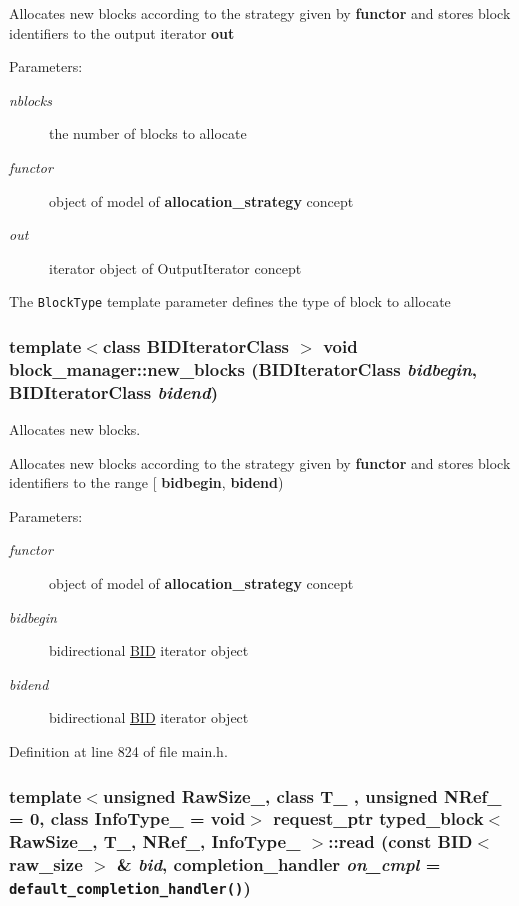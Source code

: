 Allocates new blocks according to the strategy given by {\bf functor} and stores block identifiers to the output iterator {\bf out} \begin{Desc}
\item[Parameters:]
\begin{description}
\item[{\em nblocks}]the number of blocks to allocate \item[{\em functor}]object of model of {\bf allocation\_\-strategy} concept \item[{\em out}]iterator object of OutputIterator concept\end{description}
\end{Desc}
The {\tt BlockType} template parameter defines the type of block to allocate \hypertarget{group__mnglayer_gb012fd7abe2b4b529b9f6b339aff4232}{
\subsubsection[{new\_\-blocks}]{\setlength{\rightskip}{0pt plus 5cm}template$<$class BIDIteratorClass $>$ void block\_\-manager::new\_\-blocks (BIDIteratorClass {\em bidbegin}, \/  BIDIteratorClass {\em bidend})}}
\label{group__mnglayer_gb012fd7abe2b4b529b9f6b339aff4232}


Allocates new blocks. 

Allocates new blocks according to the strategy given by {\bf functor} and stores block identifiers to the range \mbox{[} {\bf bidbegin}, {\bf bidend}) \begin{Desc}
\item[Parameters:]
\begin{description}
\item[{\em functor}]object of model of {\bf allocation\_\-strategy} concept \item[{\em bidbegin}]bidirectional \hyperlink{structBID}{BID} iterator object \item[{\em bidend}]bidirectional \hyperlink{structBID}{BID} iterator object \end{description}
\end{Desc}


Definition at line 824 of file main.h.\hypertarget{group__mnglayer_ge5f58b3358b383d44832ce0fbef7e015}{
\subsubsection[{read}]{\setlength{\rightskip}{0pt plus 5cm}template$<$unsigned RawSize\_\-, class T\_\- , unsigned NRef\_\- = 0, class InfoType\_\-  = void$>$ {\bf request\_\-ptr} {\bf typed\_\-block}$<$ RawSize\_\-, T\_\-, NRef\_\-, InfoType\_\- $>$::read (const {\bf BID}$<$ raw\_\-size $>$ \& {\em bid}, \/  {\bf completion\_\-handler} {\em on\_\-cmpl} = {\tt {\bf default\_\-completion\_\-handler}()})}}
\label{group__mnglayer_ge5f58b3358b383d44832ce0fbef7e015}


